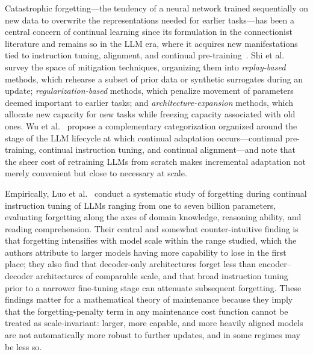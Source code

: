 \documentclass[electronics,article,submit,pdftex,moreauthors]{Definitions/mdpi}
\begin{document}
Catastrophic forgetting---the tendency of a neural network trained sequentially on new data to overwrite the representations needed for earlier tasks---has been a central concern of continual learning since its formulation in the connectionist literature and remains so in the LLM era, where it acquires new manifestations tied to instruction tuning, alignment, and continual pre-training~\cite{Shi2024,Wu2024}. Shi et al.~\cite{Shi2024} survey the space of mitigation techniques, organizing them into \textit{replay-based} methods, which rehearse a subset of prior data or synthetic surrogates during an update; \textit{regularization-based} methods, which penalize movement of parameters deemed important to earlier tasks; and \textit{architecture-expansion} methods, which allocate new capacity for new tasks while freezing capacity associated with old ones. Wu et al.~\cite{Wu2024} propose a complementary categorization organized around the stage of the LLM lifecycle at which continual adaptation occurs---continual pre-training, continual instruction tuning, and continual alignment---and note that the sheer cost of retraining LLMs from scratch makes incremental adaptation not merely convenient but close to necessary at scale.

Empirically, Luo et al.~\cite{Luo2023} conduct a systematic study of forgetting during continual instruction tuning of LLMs ranging from one to seven billion parameters, evaluating forgetting along the axes of domain knowledge, reasoning ability, and reading comprehension. Their central and somewhat counter-intuitive finding is that forgetting intensifies with model scale within the range studied, which the authors attribute to larger models having more capability to lose in the first place; they also find that decoder-only architectures forget less than encoder--decoder architectures of comparable scale, and that broad instruction tuning prior to a narrower fine-tuning stage can attenuate subsequent forgetting. These findings matter for a mathematical theory of maintenance because they imply that the forgetting-penalty term in any maintenance cost function cannot be treated as scale-invariant: larger, more capable, and more heavily aligned models are not automatically more robust to further updates, and in some regimes may be less so.
\end{document}
